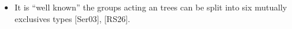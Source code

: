 \documentclass[preview]{standalone}
\begin{document}
\begin{center}
\begin{itemize} \item It is ``well known'' the groups acting an trees can be split into six mutually exclusives types [Ser03], [RS26].\end{itemize}
\end{center}
\end{document}
